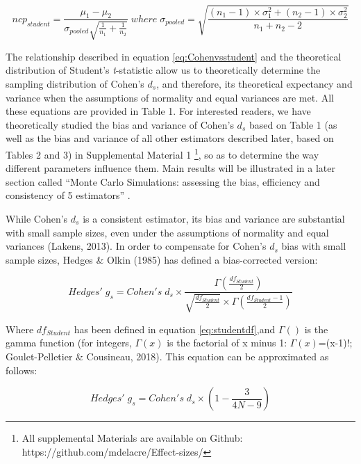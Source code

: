 \documentclass[
  man,floatsintext]{apa6}
\begin{document}
\begin{equation} 
ncp_{student} = \frac{\mu_1-\mu_2}{\sigma_{pooled} \sqrt{\frac{1}{n_1}+\frac{1}{n_2}}} \; where \; \sigma_{pooled}= \sqrt{\frac{(n_1-1) \times \sigma^2_1+(n_2-1) \times \sigma^2_2}{n_1+n_2-2}}
\label{eq:studentncp}
\end{equation}

The relationship described in equation \ref{eq:Cohenvsstudent} and the theoretical distribution of Student's \emph{t}-statistic allow us to theoretically determine the sampling distribution of Cohen's \(d_s\), and therefore, its theoretical expectancy and variance when the assumptions of normality and equal variances are met. All these equations are provided in Table 1. For interested readers, we have theoretically studied the bias and variance of Cohen's \(d_s\) based on Table 1 (as well as the bias and variance of all other estimators described later, based on Tables 2 and 3) in Supplemental Material 1 \footnote{All supplemental Materials are available on Github: https://github.com/mdelacre/Effect-sizes/}, so as to determine the way different parameters influence them. Main results will be illustrated in a later section called \enquote{Monte Carlo Simulations: assessing the bias, efficiency and consistency of 5 estimators} .

While Cohen's \(d_s\) is a consistent estimator, its bias and variance are substantial with small sample sizes, even under the assumptions of normality and equal variances (Lakens, 2013). In order to compensate for Cohen's \(d_s\) bias with small sample sizes, Hedges \& Olkin (1985) has defined a bias-corrected version:

\begin{equation} 
Hedges' \; g_s = Cohen's \; d_s \times \frac{\Gamma(\frac{df_{Student}}{2})}{\sqrt{\frac{df_{Student}}{2}} \times \Gamma(\frac{df_{Student}-1}{2})}
\label{eq:Hedgesgs}
\end{equation}

Where \(df_{Student}\) has been defined in equation \ref{eq:studentdf},and \(\Gamma()\) is the gamma function (for integers, \(\Gamma(x)\) is the factorial of x minus 1: \(\Gamma(x)\)=(x-1)!; Goulet-Pelletier \& Cousineau, 2018). This equation can be approximated as follows:

\begin{equation} 
Hedges' \; g_s = Cohen's \; d_s \times \left( 1- \frac{3}{4N -9} \right)
\label{eq:Hedgesgsapprox}
\end{equation}
\end{document}
